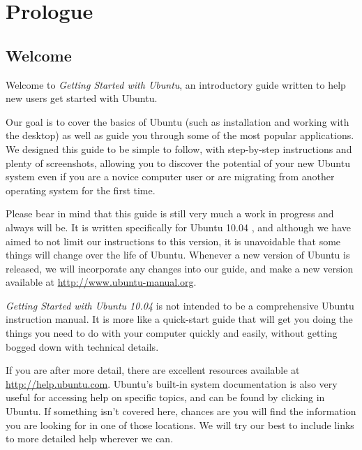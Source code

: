 
\chapter{Prologue}
\label{ch:prologue}

\section{Welcome}

Welcome to \emph{Getting Started with Ubuntu}, an introductory guide written to help new users get started with Ubuntu. %

Our goal is to cover the basics of Ubuntu (such as installation and working with the desktop) as well as guide you through some of the most popular applications. We designed this guide to be simple to follow, with step-by-step instructions and plenty of screenshots, allowing you to discover the potential of your new Ubuntu system even if you are a novice computer user or are migrating from another operating system for the first time.

Please bear in mind that this guide is still very much a work in progress and always will be. It is written specifically for Ubuntu 10.04 , and although we have aimed to not limit our instructions to this version, it is unavoidable that some things will change over the life of Ubuntu. Whenever a new version of Ubuntu is released, we will incorporate any changes into our guide, and make a new version available at \url{http://www.ubuntu-manual.org}.

\emph{Getting Started with Ubuntu 10.04} is not intended to be a comprehensive Ubuntu instruction manual. It is more like a quick-start guide that will get you doing the things you need to do with your computer quickly and easily, without getting bogged down with technical details.


If you are after more detail, there are excellent resources available at \url{http://help.ubuntu.com}. Ubuntu's built-in system documentation is also very useful for accessing help on specific topics, and can be found by clicking  in Ubuntu.
%
If something isn't covered here, chances are you will find the information you are looking for in one of those locations. We will try our best to include links to more detailed help wherever we can.

